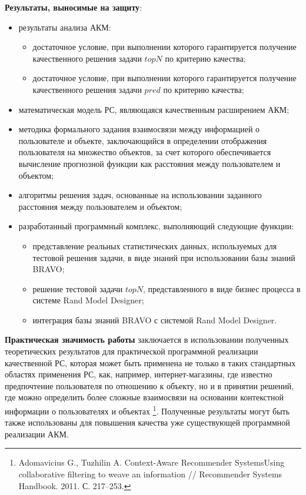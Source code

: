 {\bf Результаты, выносимые на защиту}:
\begin{itemize}
\item результаты анализа АКМ:
  \begin{itemize}
	\item достаточное условие, при выполнении которого гарантируется получение
		качественного решения задачи $topN$ по критерию качества;
	\item достаточное условие, при выполнении которого гарантируется получение
		качественного решения задачи $pred$ по критерию качества;
  \end{itemize}
\item математическая модель РС, являющаяся качественным расширением АКМ;
\item методика формального задания взаимосвязи между информацией
	о пользователе и объекте,
	заключающийся в определении отображения пользователя на множество объектов,
	за счет которого обеспечивается вычисление прогнозной функции как
	расстояния между пользователем и объектом;
\item алгоритмы решения задач, основанные на использовании заданного
	расстояния между пользователем и объектом;
\item разработанный программный комплекс, выполняющий следующие функции:
	\begin{itemize}
		\item представление реальных статистических данных, используемых для тестовой решения задачи, в виде знаний при использовании базы знаний BRAVO;
		\item решение тестовой задачи $topN$, представленного в виде бизнес процесса в системе Rand Model Designer;
		\item интеграция базы знаний BRAVO с системой Rand Model Designer.
	\end{itemize}
\end{itemize}

{\bf Практическая значимость работы} заключается в использовании
полученных теоретических результатов для практической программной реализации
качественной РС, которая может быть применена не только в таких стандартных
областях применения РС, как, например, интернет-магазины,
где известно предпочтение пользователя по отношению к объекту, но и
в принятии решений, где можно определить более сложные взаимосвязи на основании
контекстной информации о пользователях и объектах \footnote{Adomavicius G., Tuzhilin A. Context-Aware Recommender SystemsUsing
collaborative filtering to weave an information // Recommender Systems
Handbook. 2011. С. 217–253.}.
Полученные результаты могут быть также использованы для повышения
качества уже существующей программной реализации АКМ.

